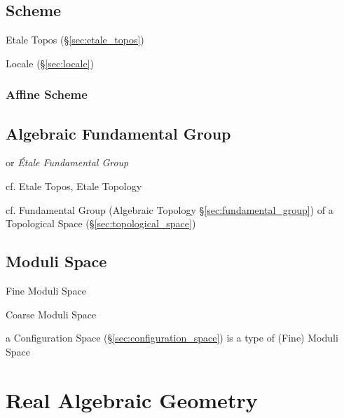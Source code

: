 \subsection{Scheme}\label{sec:scheme}

Etale Topos (\S\ref{sec:etale_topos})

Locale (\S\ref{sec:locale})



\subsubsection{Affine Scheme}\label{sec:affine_scheme}



\subsection{Algebraic Fundamental Group}\label{sec:algebraic_fundamental_group}

or \emph{\'Etale Fundamental Group}

cf. Etale Topos, Etale Topology

cf. Fundamental Group (Algebraic Topology \S\ref{sec:fundamental_group}) of a
Topological Space (\S\ref{sec:topological_space})



\subsection{Moduli Space}\label{sec:moduli_space}

Fine Moduli Space

Coarse Moduli Space

a Configuration Space (\S\ref{sec:configuration_space}) is a type of (Fine)
Moduli Space



\section{Real Algebraic Geometry}\label{sec:real_algebraic_geometry}

